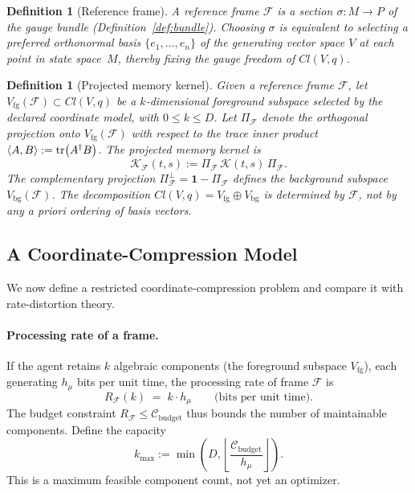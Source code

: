 \documentclass[12pt]{article}
\newtheorem{definition}[theorem]{Definition}
\begin{document}
\begin{definition}[Reference frame]
\label{def:frame}
A \emph{reference frame} $\mathcal{F}$ is a section
$\sigma: M \to P$ of the gauge bundle
(Definition~\ref{def:bundle}).
Choosing $\sigma$ is equivalent to selecting a preferred
orthonormal basis $\{e_1, \ldots, e_n\}$ of the generating
vector space $V$ at each point in state space~$M$, thereby
fixing the gauge freedom of $Cl(V,q)$.
\end{definition}

\begin{definition}[Projected memory kernel]
\label{def:projected}
Given a reference frame $\mathcal{F}$, let
$V_{\mathrm{fg}}(\mathcal{F}) \subset Cl(V,q)$ be a
$k$-dimensional \emph{foreground subspace} selected by the declared
coordinate model, with $0\leq k\leq D$.
Let $\Pi_{\mathcal{F}}$ denote the orthogonal projection
onto $V_{\mathrm{fg}}(\mathcal{F})$ with respect to the
trace inner product
$\langle A, B \rangle := \tr(A^\dagger B)$.
The \emph{projected memory kernel} is
\begin{equation}
\label{eq:projected_kernel}
\mathcal{K}_{\mathcal{F}}(t,s)
:= \Pi_{\mathcal{F}}\,\mathcal{K}(t,s)\,
   \Pi_{\mathcal{F}}.
\end{equation}
The complementary projection
$\Pi_{\mathcal{F}}^{\perp}
= \mathbf{1} - \Pi_{\mathcal{F}}$ defines the
\emph{background subspace} $V_{\mathrm{bg}}(\mathcal{F})$.
The decomposition
$Cl(V,q) = V_{\mathrm{fg}} \oplus V_{\mathrm{bg}}$
is determined by $\mathcal{F}$, not by any \emph{a priori}
ordering of basis vectors.
\end{definition}

\subsection{A Coordinate-Compression Model}
\label{subsec:RD_bound}

We now define a restricted coordinate-compression problem and compare it
with rate-distortion theory.

\paragraph{Processing rate of a frame.}
If the agent retains $k$ algebraic components (the foreground
subspace $V_{\mathrm{fg}}$), each generating $h_\mu$ bits
per unit time, the processing rate of frame $\mathcal{F}$ is
\begin{equation}
\label{eq:R_frame}
R_{\mathcal{F}}(k) \;=\; k \cdot h_\mu
\qquad\text{(bits per unit time)}.
\end{equation}
The budget constraint $R_{\mathcal{F}} \leq
\mathcal{C}_{\mathrm{budget}}$ thus bounds the number of
maintainable components.
Define the capacity
\begin{equation}
k_{\max}:=\min\!\left(D,
\left\lfloor\frac{\mathcal C_{\mathrm{budget}}}{h_\mu}\right\rfloor
\right).
\end{equation}
This is a maximum feasible component count, not yet an optimizer.
\end{document}
